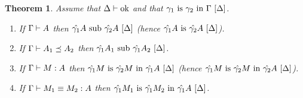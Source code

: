 \documentclass{article}
\theoremstyle{break}
\newtheorem{theorem}{Theorem}
\newcommand{\env}{\gamma}
\newcommand{\envone}{\hat{\env_1}}
\newcommand{\envtwo}{\hat{\env_2}}
\begin{document}
\begin{theorem}
Assume that ${\Delta}\vdash\mbox{ok}$ and that
$\semanticequivenv{\world}{\env_1}{\env_2}{\context}$.
\begin{enumerate}
\item If $\Gamma\vdash A$ then $\semanticsubtype{\world}{\envone\kind}{\envtwo\kind}$
(hence $\semanticequivtype{\world}{\envone\kind}{\envtwo\kind}$).
\item If $\mbox{$\Gamma\vdash A_1 \preceq A_2$}$ then
$\semanticsubtype{\world}{\envone\kind_1}{\envone\kind_2}$.
\item If $\Gamma\vdash M : A$ then
$\semanticequivterm{\world}{\envone\constructor}{\envtwo{\constructor}}{\envone\kind}$
(hence $\semanticequivterm{\world}{\envone\constructor}{\envtwo{\constructor}}{\envtwo\kind}$).
\item If $\Gamma\vdash M_1 \equiv M_2 : A$
then $\semanticequivterm{\world}{\envone\constructor_1}{\envone\constructor_2}{\envone\kind}$.
\end{enumerate}
\end{theorem}
\end{document}
